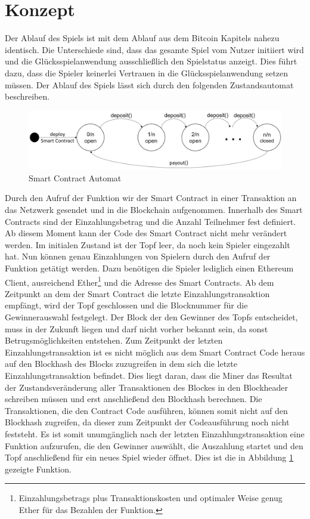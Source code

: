 \section{Konzept} \label{eth_konzept}

Der Ablauf des Spiels ist mit dem Ablauf aus dem Bitcoin Kapitels nahezu identisch. Die Unterschiede sind, dass das gesamte Spiel vom Nutzer initiiert wird und die Glücksspielanwendung ausschließlich den Spielstatus anzeigt. Dies führt dazu, dass die Spieler keinerlei Vertrauen in die Glücksspielanwendung setzen müssen. Der Ablauf des Spiels lässt sich durch den folgenden Zustandsautomat beschreiben.

\begin{figure}[H]
\centering
\includegraphics[width=1\linewidth]{Figures/umsetzung_eth/smart_contract_automat_idea}
\decoRule
\caption{Smart Contract Automat}
\label{fig:smart_contract_automat_idea}
\end{figure}

Durch den Aufruf der  Funktion wir der Smart Contract in einer Transaktion an das Netzwerk gesendet und in die Blockchain aufgenommen. Innerhalb des Smart Contracts sind der Einzahlungsbetrag und die Anzahl Teilnehmer  fest definiert. Ab diesem Moment kann der Code des Smart Contract nicht mehr verändert werden. Im initialen Zustand ist der Topf leer, da noch kein Spieler eingezahlt hat. Nun können genau  Einzahlungen von Spielern durch den Aufruf der  Funktion getätigt werden. Dazu benötigen die Spieler lediglich einen Ethereum Client, ausreichend Ether\footnote{Einzahlungsbetrags plus Transaktionskosten und optimaler Weise genug Ether für das Bezahlen der  Funktion.} und die Adresse des Smart Contracts. Ab dem Zeitpunkt an dem der Smart Contract die letzte Einzahlungstransaktion empfängt, wird der Topf geschlossen und die Blocknummer für die Gewinnerauswahl festgelegt. Der Block der den Gewinner des Topfs entscheidet, muss in der Zukunft liegen und darf nicht vorher bekannt sein, da sonst Betrugsmöglichkeiten entstehen. Zum Zeitpunkt der letzten Einzahlungstransaktion ist es nicht möglich aus dem Smart Contract Code heraus auf den Blockhash des Blocks zuzugreifen in dem sich die letzte Einzahlungstransaktion befindet. Dies liegt daran, dass die Miner das Resultat der Zustandsveränderung aller Transaktionen des Blockes in den Blockheader schreiben müssen und erst anschließend den Blockhash berechnen. Die Transaktionen, die den Contract Code ausführen, können somit nicht auf den Blockhash zugreifen, da dieser zum Zeitpunkt der Codeausführung noch nicht feststeht. Es ist somit unumgänglich nach der letzten Einzahlungstransaktion eine Funktion aufzurufen, die den Gewinner auswählt, die Auszahlung startet und den Topf anschließend für ein neues Spiel wieder öffnet. Dies ist die in Abbildung \ref{fig:smart_contract_automat_idea} gezeigte  Funktion.